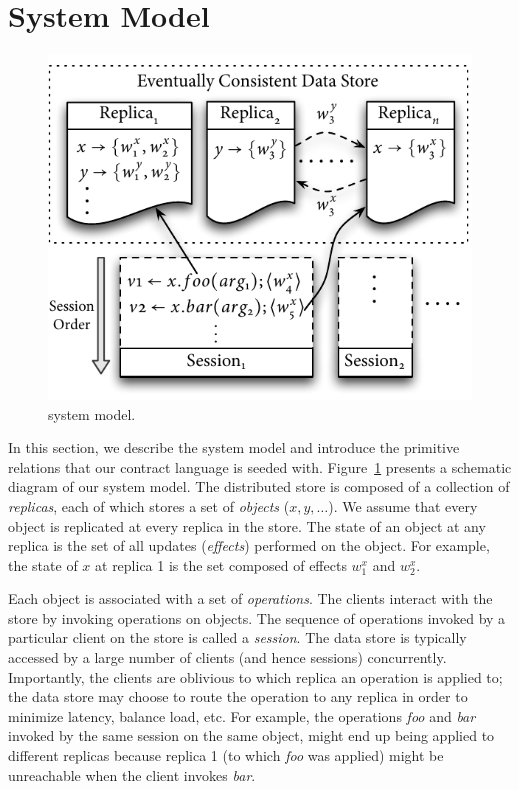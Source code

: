 \section{System Model}
\label{sec:sysmod}

\begin{figure}
\centering
\includegraphics[width=0.7\columnwidth]{Figures/SystemModel}
\caption{\name system model.}
\label{fig:sysmod}
\end{figure}

In this section, we describe the system model and introduce the primitive
relations that our contract language is seeded with. Figure~\ref{fig:sysmod}
presents a schematic diagram of our system model. The distributed store is
composed of a collection of \emph{replicas}, each of which stores a set of
\emph{objects} ($x,y,\ldots$). We assume that every object is replicated at
every replica in the store. The state of an object at any replica is the set of
all updates (\emph{effects}) performed on the object. For example, the state of
$x$ at replica 1 is the set composed of effects $w^x_1$ and $w^x_2$.

Each object is associated with a set of \emph{operations}. The clients interact
with the store by invoking operations on objects. The sequence of operations
invoked by a particular client on the store is called a \emph{session}. The
data store is typically accessed by a large number of clients (and hence
sessions) concurrently. Importantly, the clients are oblivious to which replica
an operation is applied to; the data store may choose to route the operation to
any replica in order to minimize latency, balance load, etc. For example, the
operations \emph{foo} and \emph{bar} invoked by the same session on the same
object, might end up being applied to different replicas because replica 1 (to
which \emph{foo} was applied) might be unreachable when the client invokes
\emph{bar}.

